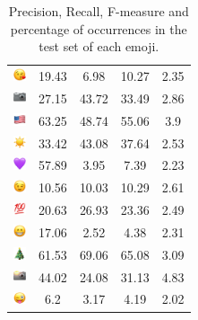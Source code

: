 \documentclass{article}
\begin{document}
\begin{table}
\begin{tabular}{|c|ccc|c|}
\includegraphics[height=0.37cm,width=0.37cm]{img/face_blowing_a_kiss.png} & 19.43 & 6.98 & 10.27 & 2.35\\ 
\includegraphics[height=0.37cm,width=0.37cm]{img/camera.png} & 27.15 & 43.72 & 33.49 & 2.86\\ 
\includegraphics[height=0.37cm,width=0.37cm]{img/United_States.png} & 63.25 & 48.74 & 55.06 & 3.9\\ 
\includegraphics[height=0.37cm,width=0.37cm]{img/sun.png} & 33.42 & 43.08 & 37.64 & 2.53\\ 
\includegraphics[height=0.37cm,width=0.37cm]{img/purple_heart.png} & 57.89 & 3.95 & 7.39 & 2.23\\ 
\includegraphics[height=0.37cm,width=0.37cm]{img/winking_face.png} & 10.56 & 10.03 & 10.29 & 2.61\\ 
\includegraphics[height=0.37cm,width=0.37cm]{img/hundred_points.png} & 20.63 & 26.93 & 23.36 & 2.49\\ 
\includegraphics[height=0.37cm,width=0.37cm]{img/beaming_face_with_smiling_eyes.png} & 17.06 & 2.52 & 4.38 & 2.31\\ 
\includegraphics[height=0.37cm,width=0.37cm]{img/Christmas_tree.png} & 61.53 & 69.06 & 65.08 & 3.09\\ 
\includegraphics[height=0.37cm,width=0.37cm]{img/camera_with_flash.png} & 44.02 & 24.08 & 31.13 & 4.83\\ 
\includegraphics[height=0.37cm,width=0.37cm]{img/winking_face_with_tongue.png} & 6.2 & 3.17 & 4.19 & 2.02\\ 

\hline
\end{tabular}
\caption{\label{table:emoji_detailed} Precision, Recall, F-measure and percentage of occurrences in the test set of each emoji.}
\end{table}
\end{document}
